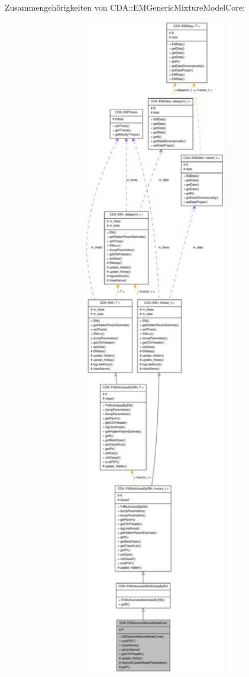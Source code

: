 Zusammengehörigkeiten von CDA::EMGenericMixtureModelCore:\nopagebreak
\begin{figure}[H]
\begin{center}
\leavevmode
\includegraphics[width=400pt]{classCDA_1_1EMGenericMixtureModelCore__coll__graph}
\end{center}
\end{figure}
